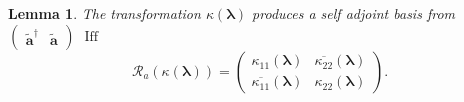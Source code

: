 \documentclass[aps, preprint]{revtex4}
\newtheorem{lemma}[theorem]{Lemma}
\begin{document}
\begin{lemma}
The transformation $\kappa  \left (\mathbf{\lambda }\right )$ produces a self adjoint basis from $\left (\begin{array}{cc}\widetilde{\mathbf{a}}^{ \dag } & \widetilde{\mathbf{a}}\end{array}\right )$ $\ensuremath{\operatorname*{Iff}}$
\begin{equation}\mathcal{R}_{a} \left (\kappa  \left (\mathbf{\lambda }\right )\right ) =\left (\begin{array}{cc}\kappa _{1 1} \left (\mathbf{\lambda }\right ) & \overline{\kappa _{2 2}} \left (\mathbf{\lambda }\right ) \\
\overline{\kappa _{1 1}} \left (\mathbf{\lambda }\right ) & \kappa _{2 2} \left (\mathbf{\lambda }\right )\end{array}\right )\text{.}
\end{equation}
\end{lemma}
\end{document}
